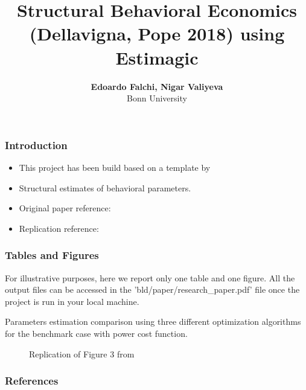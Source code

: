\documentclass[11pt]{beamer}
\begin{document}
\title{Structural Behavioral Economics (Dellavigna, Pope 2018) using Estimagic}

\author[Edoardo Falchi, Nigar Valiyeva]
{
{\bf Edoardo Falchi, Nigar Valiyeva}\\
{\small Bonn University}\\[1ex]
}


\begin{frame}
    \titlepage
    \note{~}
\end{frame}


\begin{frame}[t]
    \frametitle{Introduction}
    \begin{itemize}
        \item<+-> This project has been build based on a template by \cite{GaudeckerEconProjectTemplates}
                \item<+-> Structural estimates of behavioral parameters.
        \item<+-> Original paper reference: \cite{dellavigna2018motivates}
        \item<+-> Replication reference: \cite{PozziNunnari}
    \end{itemize}
    \note{~}
\end{frame}

\begin{frame}[t]
    \frametitle{Tables and Figures}
    For illustrative purposes, here we report only one table and one figure. All the output files can be accessed in the 'bld/paper/research\_paper.pdf' file once the project is run in your local machine.

\begin{table}
\scalebox{0.75}{}
\caption{Parameters estimation comparison using three different optimization algorithms for the benchmark case with power cost function.}
\end{table}
\end{frame}

\begin{frame}[t]
\begin{figure}
\caption{Replication of Figure 3 from \cite{dellavigna2018motivates}}
\end{figure}
\end{frame}


 {
    \begin{frame}
        \frametitle{}
    \end{frame}

}

\begin{frame}[allowframebreaks]
    \frametitle{References}

    \renewcommand{\bibfont}{\normalfont\footnotesize}
    \printbibliography

\end{frame}
\end{document}
